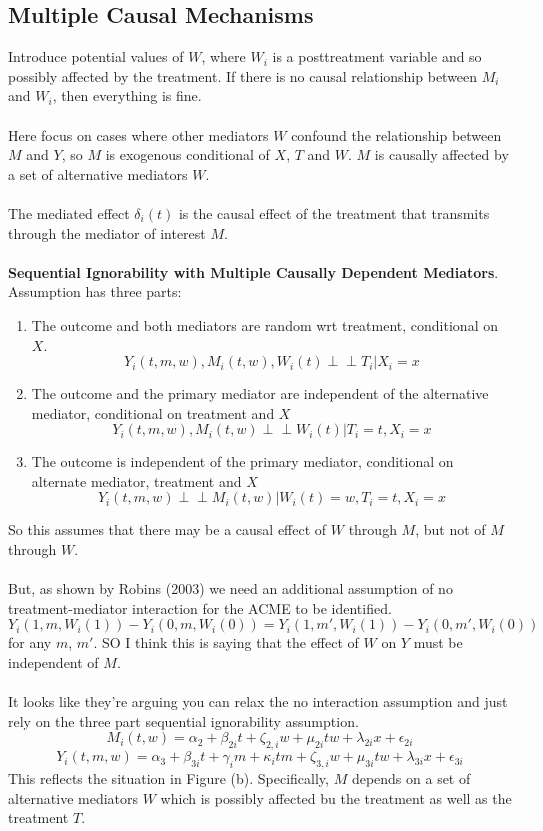 \documentclass{article}
\newcommand{\indep}{\perp\!\!\!\!\perp}
\begin{document}
	
	\subsection{Multiple Causal Mechanisms}
	
	Introduce potential values of $W$, where $W_i$ is a posttreatment variable and so possibly affected by the treatment. If there is no causal relationship between $M_i$ and $W_i$, then everything is fine. 
	\\~\\
	Here focus on cases where other mediators $W$ confound the relationship between $M$ and $Y$, so $M$ is exogenous conditional of $X$, $T$ and $W$.  $M$ is causally affected by a set of alternative mediators $W$. 
	\\~\\
	The mediated effect $\delta_i(t)$ is the causal effect of the treatment that transmits through the mediator of interest $M$. 
	\\~\\
	\textbf{Sequential Ignorability with Multiple Causally Dependent Mediators}.
	Assumption has three parts:
	\begin{enumerate}
		\item The outcome and both mediators are random wrt treatment, conditional on $X$. 
		$$
		Y_i(t,m,w), M_i(t,w), W_i(t) \indep T_i | X_i = x
		$$
		\item The outcome and the primary mediator are independent of the alternative mediator, conditional on treatment and $X$
		$$
		Y_i(t,m,w), M_i(t,w) \indep W_i(t) | T_i =t, X_i = x
		$$
		\item The outcome is independent of the primary mediator, conditional on alternate mediator, treatment and $X$
		$$
		Y_i(t,m,w) \indep M_i(t,w) | W_i(t) =w, T_i =t, X_i = x
		$$
	\end{enumerate}
	So this assumes that there may be a causal effect of $W$ through $M$, but not of $M$ through $W$. 
	\\~\\
	But, as shown by Robins (2003) we need an additional assumption of no treatment-mediator interaction for the ACME to be identified. 
	$$
	Y_i(1, m, W_i(1)) - Y_i(0,m,W_i(0)) = Y_i(1, m', W_i(1)) - Y_i(0,m',W_i(0))
	$$
	for any $m$, $m'$. SO I think this is saying that the effect of $W$ on $Y$ must be independent of $M$. 
	\\~\\
	It looks like they're arguing you can relax the no interaction assumption and just rely on the three part sequential ignorability assumption. 
	$$
	M_i(t,w) = \alpha_2 + \beta_{2i} t + \zeta_{2,i}w + \mu_{2i} t  w + \lambda_{2i} x + \epsilon_{2i}
	$$
	$$
	Y_i(t,m,w) = \alpha_3 + \beta_{3i} t + \gamma_i m + \kappa_i t m + \zeta_{3,i} w + \mu_{3i} t  w + \lambda_{3i} x + \epsilon_{3i}
	$$
	This reflects the situation in Figure (b). Specifically, $M$ depends on a set of alternative mediators $W$ which is possibly affected bu the treatment as well as the treatment $T$. 
	
\end{document}

